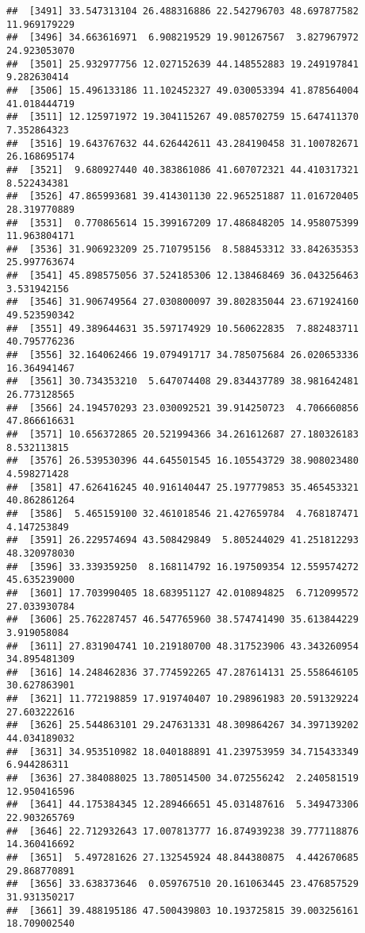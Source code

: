 \documentclass[
]{article}
\begin{document}
\begin{verbatim}
##  [3491] 33.547313104 26.488316886 22.542796703 48.697877582 11.969179229
##  [3496] 34.663616971  6.908219529 19.901267567  3.827967972 24.923053070
##  [3501] 25.932977756 12.027152639 44.148552883 19.249197841  9.282630414
##  [3506] 15.496133186 11.102452327 49.030053394 41.878564004 41.018444719
##  [3511] 12.125971972 19.304115267 49.085702759 15.647411370  7.352864323
##  [3516] 19.643767632 44.626442611 43.284190458 31.100782671 26.168695174
##  [3521]  9.680927440 40.383861086 41.607072321 44.410317321  8.522434381
##  [3526] 47.865993681 39.414301130 22.965251887 11.016720405 28.319770889
##  [3531]  0.770865614 15.399167209 17.486848205 14.958075399 11.963804171
##  [3536] 31.906923209 25.710795156  8.588453312 33.842635353 25.997763674
##  [3541] 45.898575056 37.524185306 12.138468469 36.043256463  3.531942156
##  [3546] 31.906749564 27.030800097 39.802835044 23.671924160 49.523590342
##  [3551] 49.389644631 35.597174929 10.560622835  7.882483711 40.795776236
##  [3556] 32.164062466 19.079491717 34.785075684 26.020653336 16.364941467
##  [3561] 30.734353210  5.647074408 29.834437789 38.981642481 26.773128565
##  [3566] 24.194570293 23.030092521 39.914250723  4.706660856 47.866616631
##  [3571] 10.656372865 20.521994366 34.261612687 27.180326183  8.532113815
##  [3576] 26.539530396 44.645501545 16.105543729 38.908023480  4.598271428
##  [3581] 47.626416245 40.916140447 25.197779853 35.465453321 40.862861264
##  [3586]  5.465159100 32.461018546 21.427659784  4.768187471  4.147253849
##  [3591] 26.229574694 43.508429849  5.805244029 41.251812293 48.320978030
##  [3596] 33.339359250  8.168114792 16.197509354 12.559574272 45.635239000
##  [3601] 17.703990405 18.683951127 42.010894825  6.712099572 27.033930784
##  [3606] 25.762287457 46.547765960 38.574741490 35.613844229  3.919058084
##  [3611] 27.831904741 10.219180700 48.317523906 43.343260954 34.895481309
##  [3616] 14.248462836 37.774592265 47.287614131 25.558646105 30.627863901
##  [3621] 11.772198859 17.919740407 10.298961983 20.591329224 27.603222616
##  [3626] 25.544863101 29.247631331 48.309864267 34.397139202 44.034189032
##  [3631] 34.953510982 18.040188891 41.239753959 34.715433349  6.944286311
##  [3636] 27.384088025 13.780514500 34.072556242  2.240581519 12.950416596
##  [3641] 44.175384345 12.289466651 45.031487616  5.349473306 22.903265769
##  [3646] 22.712932643 17.007813777 16.874939238 39.777118876 14.360416692
##  [3651]  5.497281626 27.132545924 48.844380875  4.442670685 29.868770891
##  [3656] 33.638373646  0.059767510 20.161063445 23.476857529 31.931350217
##  [3661] 39.488195186 47.500439803 10.193725815 39.003256161 18.709002540

\end{verbatim}
\end{document}
